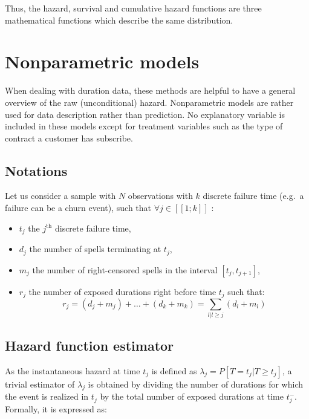 \documentclass[
]{book}
\providecommand{\tightlist}{%
  \setlength{\itemsep}{0pt}\setlength{\parskip}{0pt}}
\begin{document}
Thus, the hazard, survival and cumulative hazard functions are three mathematical functions which describe the same distribution.

\hypertarget{nonparam}{%
\section{Nonparametric models}\label{nonparam}}

When dealing with duration data, these methods are helpful to have a general overview of the raw (unconditional) hazard. Nonparametric models are rather used for data description rather than prediction. No explanatory variable is included in these models except for treatment variables such as the type of contract a customer has subscribe.

\hypertarget{notations}{%
\subsection{Notations}\label{notations}}

Let us consider a sample with \(N\) observations with \(k\) discrete failure time (e.g.~a failure can be a churn event), such that \(\forall j \in [\![1; k]\!]\) :

\begin{itemize}
\tightlist
\item
  \(t_j\) the \(j^{\text{th}}\) discrete failure time,
\item
  \(d_j\) the number of spells terminating at \(t_j\),
\item
  \(m_j\) the number of right-censored spells in the interval \([t_j, t_{j+1}]\),
\item
  \(r_j\) the number of exposed durations right before time \(t_j\) such that:
  \begin{equation}
  r_j = (d_j + m_j) + \dots + (d_k + m_k) = \sum_{l|l \geq j} (d_l + m_l)
  \label{eq:exposed}
  \end{equation}
\end{itemize}

\hypertarget{hazard-function-estimator}{%
\subsection{Hazard function estimator}\label{hazard-function-estimator}}

As the instantaneous hazard at time \(t_j\) is defined as \(\lambda_j = P[T=t_j|T\geq t_j]\), a trivial estimator of \(\lambda_j\) is obtained by dividing the number of durations for which the event is realized in \(t_j\) by the total number of exposed durations at time \(t_j^{-}\). Formally, it is expressed as:
\end{document}

